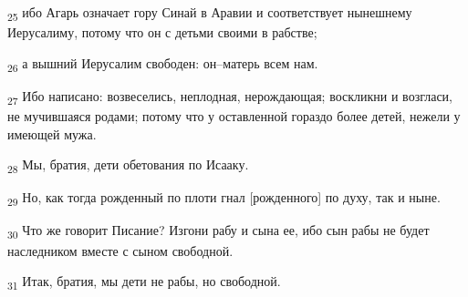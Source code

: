 \begin{tcolorbox}
\textsubscript{25} ибо Агарь означает гору Синай в Аравии и соответствует нынешнему Иерусалиму, потому что он с детьми своими в рабстве;
\end{tcolorbox}
\begin{tcolorbox}
\textsubscript{26} а вышний Иерусалим свободен: он--матерь всем нам.
\end{tcolorbox}
\begin{tcolorbox}
\textsubscript{27} Ибо написано: возвеселись, неплодная, нерождающая; воскликни и возгласи, не мучившаяся родами; потому что у оставленной гораздо более детей, нежели у имеющей мужа.
\end{tcolorbox}
\begin{tcolorbox}
\textsubscript{28} Мы, братия, дети обетования по Исааку.
\end{tcolorbox}
\begin{tcolorbox}
\textsubscript{29} Но, как тогда рожденный по плоти гнал [рожденного] по духу, так и ныне.
\end{tcolorbox}
\begin{tcolorbox}
\textsubscript{30} Что же говорит Писание? Изгони рабу и сына ее, ибо сын рабы не будет наследником вместе с сыном свободной.
\end{tcolorbox}
\begin{tcolorbox}
\textsubscript{31} Итак, братия, мы дети не рабы, но свободной.
\end{tcolorbox}
